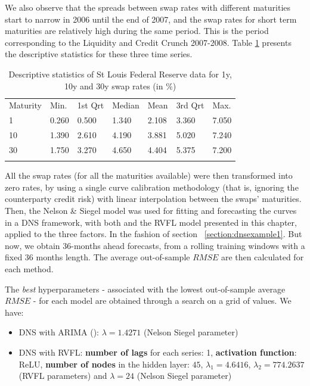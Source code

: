 \medskip

We also observe that the spreads between swap rates with different maturities start to narrow in 2006 until the end of 2007, and the  swap rates for short term maturities are relatively high during the same period. This is the period corresponding to the Liquidity and Credit Crunch 2007-2008. Table \ref{tab:freddatatables1} presents the descriptive statistics for these three time series.

\begin{table}
\begin{center}
\caption{Descriptive statistics of St Louis Federal Reserve data for 1y, 10y and 30y swap rates (in \%)}
\label{tab:freddatatables1}       %
\begin{tabular}{lllllll}
\hline\noalign{\smallskip}
Maturity & Min. & 1st Qrt & Median & Mean & 3rd Qrt & Max.\\
\noalign{\smallskip}\hline\noalign{\smallskip}
  1  & 0.260 & 0.500  & 1.340  & 2.108  & 3.360  & 7.050\\
  10 & 1.390 & 2.610  & 4.190  & 3.881  & 5.020  & 7.240\\
  30 & 1.750 & 3.270  & 4.650  & 4.404  & 5.375  & 7.200\\
\noalign{\smallskip}\hline
\end{tabular}
\end{center}
\end{table}

\medskip

All the swap rates (for all the maturities available) were then transformed into zero rates, by using a single curve calibration methodology (that is, ignoring the counterparty credit risk) with linear interpolation between the swaps' maturities. Then, the Nelson \& Siegel model was used for fitting and forecasting the curves in a DNS framework, with both  and the RVFL model presented in this chapter, applied to the three factors. In the fashion of section ~\ref{section:dnsexample1}. But now, we obtain 36-months ahead forecasts, from a rolling training windows with a fixed 36 months length. The average out-of-sample $RMSE$ are then calculated for each method.

\medskip

The \textit{best} hyperparameters - associated with the lowest out-of-sample average $RMSE$ - for each model are obtained through a search on a grid of values. We have:
\begin{itemize}
\item DNS with ARIMA (): $\lambda = 1.4271$ (Nelson Siegel parameter)
\item DNS with RVFL: \textbf{number of lags} for each series: 1, \textbf{activation function}: ReLU, \textbf{number of nodes} in the hidden layer: $45$, $\lambda_1 = 4.6416$, $\lambda_2 = 774.2637$ (RVFL parameters) and $\lambda = 24$ (Nelson Siegel parameter)
\end{itemize}

